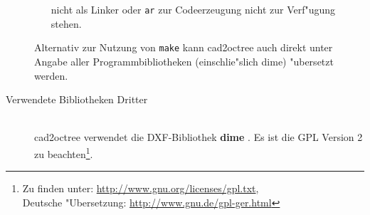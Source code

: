 \begin{description}
\begin{itemize}
	nicht als Linker oder \texttt{ar} zur Codeerzeugung nicht zur 
	Verf"ugung stehen. 
    \end{itemize} 
    Alternativ zur Nutzung von \texttt{make} kann cad2octree auch direkt 
    unter Angabe aller Programmbibliotheken (einschlie"slich dime) "ubersetzt 
    werden. 
\item[Verwendete Bibliotheken Dritter]~\\
    cad2octree verwendet die DXF-Bibliothek \textbf{dime} \cite{dime}. 
    Es ist die GPL Version 2 zu beachten\footnote{Zu finden unter: 
    \url{http://www.gnu.org/licenses/gpl.txt}, \\ Deutsche "Ubersetzung: 
    \url{http://www.gnu.de/gpl-ger.html}}. 
\end{description}




